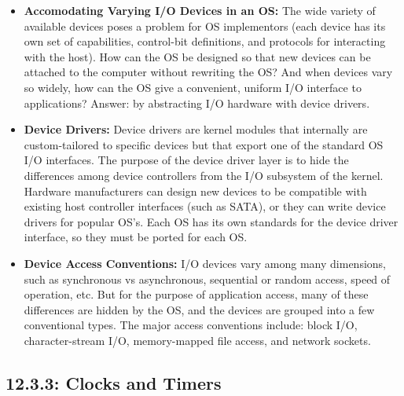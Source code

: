 \documentclass[12pt]{article}
\begin{document}
\begin{itemize}
    \item \textbf{Accomodating Varying I/O Devices in an OS:} The wide variety of available devices poses a problem for OS implementors (each device has its own set of capabilities, control-bit definitions, and protocols for interacting with the host). How can the OS be designed so that new devices can be attached to the computer without rewriting the OS? And when devices vary so widely, how can the OS give a convenient, uniform I/O interface to applications? Answer: by abstracting I/O hardware with device drivers.
    \item \textbf{Device Drivers:} Device drivers are kernel modules that internally are custom-tailored to specific devices but that export one of the standard OS I/O interfaces. The purpose of the device driver layer is to hide the differences among device controllers from the I/O subsystem of the kernel. Hardware manufacturers can design new devices to be compatible with existing host controller interfaces (such as SATA), or they can write device drivers for popular OS's. Each OS has its own standards for the device driver interface, so they must be ported for each OS.
    \item \textbf{Device Access Conventions:} I/O devices vary among many dimensions, such as synchronous vs asynchronous, sequential or random access, speed of operation, etc. But for the purpose of application access, many of these differences are hidden by the OS, and the devices are grouped into a few conventional types. The major access conventions include: block I/O, character-stream I/O, memory-mapped file access, and network sockets.
\end{itemize}

\subsection*{12.3.3: Clocks and Timers}
\end{document}
